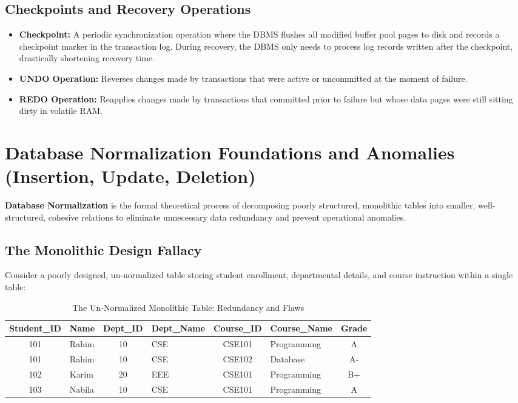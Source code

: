 \subsection{Checkpoints and Recovery Operations}

\begin{itemize}
\item \textbf{Checkpoint:} A periodic synchronization operation where the DBMS flushes all modified buffer pool pages to disk and records a checkpoint marker in the transaction log. During recovery, the DBMS only needs to process log records written after the checkpoint, drastically shortening recovery time.
\item \textbf{UNDO Operation:} Reverses changes made by transactions that were active or uncommitted at the moment of failure.
\item \textbf{REDO Operation:} Reapplies changes made by transactions that committed prior to failure but whose data pages were still sitting dirty in volatile RAM.
\end{itemize}



\newpage
\section{Database Normalization Foundations and Anomalies (Insertion, Update, Deletion)}

\textbf{Database Normalization} is the formal theoretical process of decomposing poorly structured, monolithic tables into smaller, well-structured, cohesive relations to eliminate unnecessary data redundancy and prevent operational anomalies.

\subsection{The Monolithic Design Fallacy}

Consider a poorly designed, un-normalized table storing student enrollment, departmental details, and course instruction within a single table:

\begin{table}[htbp]
\centering
\caption{The Un-Normalized Monolithic Table: Redundancy and Flaws}
\label{tab:unnormalized_table}
\begin{tabularx}{\textwidth}{c l c l c l c}
\toprule
\textbf{Student\_ID} & \textbf{Name} & \textbf{Dept\_ID} & \textbf{Dept\_Name} & \textbf{Course\_ID} & \textbf{Course\_Name} & \textbf{Grade} \\
\midrule
101 & Rahim & 10 & CSE & CSE101 & Programming & A \\
101 & Rahim & 10 & CSE & CSE102 & Database & A- \\
102 & Karim & 20 & EEE & CSE101 & Programming & B+ \\
103 & Nabila & 10 & CSE & CSE101 & Programming & A \\
\bottomrule
\end{tabularx}
\end{table}

